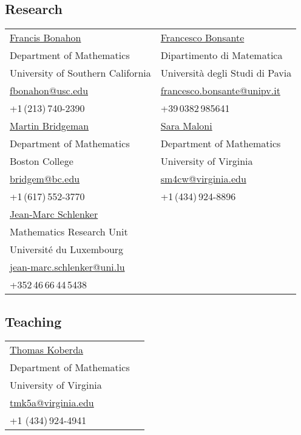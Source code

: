 
\subsection{Research}

\noindent\begin{tabular}{l l}
	\href{https://dornsife.usc.edu/francis-bonahon/}{Francis Bonahon} & \href{http://www-dimat.unipv.it/~bonsante/}{Francesco Bonsante} \\
	Department of Mathematics &  Dipartimento di Matematica  \\
	University of Southern California &  Universit\`a degli Studi di Pavia \\
	\small{\href{mailto:fbonahon@usc.edu}{fbonahon@usc.edu}} & \small{\href{mailto:francesco.bonsante@unipv.it}{francesco.bonsante@unipv.it}} \\
	\small{+1\,(213)\,740-2390} & \small{+39\,0382\,985641}\vspace{0.3cm} \\
	\href{https://sites.google.com/bc.edu/martin-bridgeman/}{Martin Bridgeman} & \href{https://sites.google.com/view/sara-maloni}{Sara Maloni} \\
	Department of Mathematics &  Department of Mathematics \\
	Boston College &  University of Virginia \\
	\small{\href{mailto:bridgem@bc.edu}{bridgem@bc.edu}} & \small{\href{mailto:sm4cw@virginia.edu}{sm4cw@virginia.edu}}\\
	\small{+1\,(617)\,552-3770} & \small{+1\,(434)\,924-8896}\vspace{0.3cm} \\
	\href{http://math.uni.lu/schlenker/}{Jean-Marc Schlenker} & \\
	Mathematics Research Unit & \\
	Universit\'e du Luxembourg & \\
	\small{\href{mailto:jean-marc.schlenker@uni.lu}{jean-marc.schlenker@uni.lu}} & \\
	\small{+352\,46\,66\,44\,5438} & 
\end{tabular}

\subsection{Teaching}

\noindent\begin{tabular}{l l}
	\href{https://sites.google.com/view/koberdat}{Thomas Koberda} & \\
	Department of Mathematics & \\
	University of Virginia & \\
	\small{\href{mailto:tmk5a@virginia.edu}{tmk5a@virginia.edu}} & \\
	\small{+1 (434)\,924-4941} &
\end{tabular}
